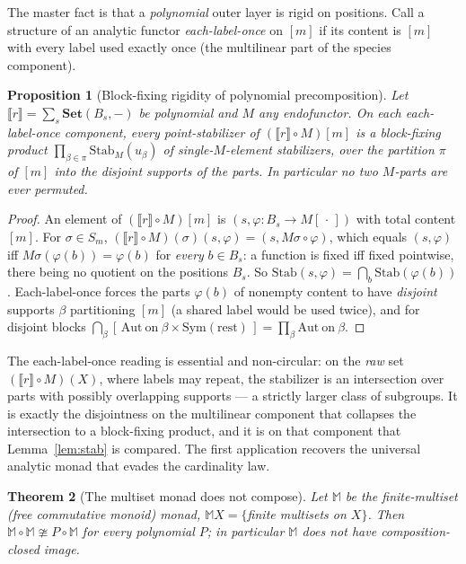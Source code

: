 \documentclass[11pt]{amsart}
\theoremstyle{plain}
\newtheorem{theorem}{Theorem}[section]
\newtheorem{proposition}[theorem]{Proposition}
\theoremstyle{definition}
\newcommand{\Set}{\mathbf{Set}}
\newcommand{\ext}[1]{\llbracket #1 \rrbracket}
\begin{document}
The master fact is that a \emph{polynomial} outer layer is rigid on positions. Call a structure
of an analytic functor \emph{each-label-once} on $[m]$ if its content is $[m]$ with every label used
exactly once (the multilinear part of the species component).

\begin{proposition}[Block-fixing rigidity of polynomial precomposition]\label{prop:meta}
Let $\ext r=\sum_{s}\Set(B_s,-)$ be polynomial and $M$ any endofunctor. On each each-label-once
component, every point-stabilizer of $(\ext r\circ M)[m]$ is a \emph{block-fixing product}
$\prod_{\beta\in\pi}\mathrm{Stab}_{M}(u_\beta)$ of single-$M$-element stabilizers, over the partition
$\pi$ of $[m]$ into the disjoint supports of the parts. In particular no two $M$-parts are ever
permuted.
\end{proposition}

\begin{proof}
An element of $(\ext r\circ M)[m]$ is $(s,\varphi\colon B_s\to M[\,\cdot\,])$ with total content
$[m]$. For $\sigma\in S_m$, $(\ext r\circ M)(\sigma)(s,\varphi)=(s,M\sigma\circ\varphi)$, which equals
$(s,\varphi)$ iff $M\sigma(\varphi(b))=\varphi(b)$ for \emph{every} $b\in B_s$: a function is fixed iff
fixed pointwise, there being no quotient on the positions $B_s$. So
$\mathrm{Stab}(s,\varphi)=\bigcap_{b}\mathrm{Stab}(\varphi(b))$. Each-label-once forces the parts
$\varphi(b)$ of nonempty content to have \emph{disjoint} supports $\beta$ partitioning $[m]$ (a shared
label would be used twice), and for disjoint blocks $\bigcap_\beta[\,\mathrm{Aut\ on\ }\beta\times
\mathrm{Sym}(\text{rest})\,]=\prod_\beta\mathrm{Aut\ on\ }\beta$.
\end{proof}

The each-label-once reading is essential and non-circular: on the \emph{raw} set $(\ext r\circ M)(X)$,
where labels may repeat, the stabilizer is an intersection over parts with possibly overlapping
supports --- a strictly larger class of subgroups. It is exactly the disjointness on the multilinear
component that collapses the intersection to a block-fixing product, and it is on that component that
Lemma~\ref{lem:stab} is compared. The first application recovers the universal analytic monad that
evades the cardinality law.

\begin{theorem}[The multiset monad does not compose]\label{thm:multiset}
Let $\mathbb M$ be the finite-multiset (free commutative monoid) monad, $\mathbb MX=\{$finite
multisets on $X\}$. Then $\mathbb M\circ\mathbb M\ncong P\circ\mathbb M$ for every polynomial $P$;
in particular $\mathbb M$ does not have composition-closed image.
\end{theorem}
\end{document}
